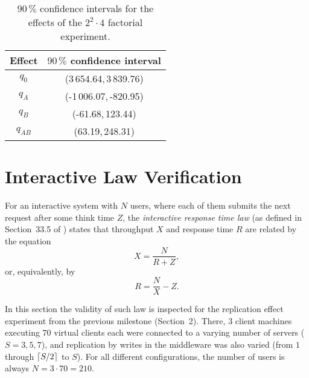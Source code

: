 \documentclass[11pt]{article}
\newcommand\task[1]{{\color[HTML]{999999}\subsection{Task}#1}}
\renewcommand\task[1]{}
\DeclarePairedDelimiter{\ceil}{\lceil}{\rceil}
\theoremstyle{definition}
\newcommand\re[1]{{\color[HTML]{ee1111}#1}}
\newcommand\bl[1]{{\color[HTML]{1111dd}#1}}
\begin{document}
\begin{table}[h!]
    \centering
    \small
    {
        \begin{tabular}{|c|c|}
            \hline
            \rowcolor{Gray}
            Effect & $90\,\%$ confidence interval \\
            \hline
            \cellcolor{Gray} $q_0$ & \bl{(3\,654.64,\,3\,839.76)} \\
            \cellcolor{Gray} $q_A$ & \bl{(-1\,006.07,\,-820.95)} \\
            \cellcolor{Gray} $q_B$ & \re{(-61.68,\,123.44)} \\
            \cellcolor{Gray} $q_{AB}$ & \bl{(63.19,\,248.31)} \\
            \hline
        \end{tabular}
    }
    \caption{$90\,\%$ confidence intervals for the effects of the $2^2\cdot4$ factorial experiment.}
    \label{tab:4_cis}
\end{table}

\task{
    Length: 1-3 pages
    
    Design a $2^k$ factorial experiment and follow the best practices outlined in the book and in the lecture to analyze the results. You are free to choose the parameters for the experiment and in case you have already collected data in the second milestone that can be used as source for this experiment, you can reuse it. Otherwise, in case you need to run new experiments anyway, we recommend exploring the impact of request size on the middleware together with an other parameter.}

\clearpage

\section{Interactive Law Verification}\label{sec:interactive-law}

For an interactive system with $N$ users, where each of them submits the next request after some think time $Z$, the \emph{interactive response time law} (as defined in Section~33.5 of \cite{jain91}) states that throughput $X$ and response time $R$ are related by the equation
\begin{equation}
    \label{eqn:5_tps_exp}
    X=\frac N{R+Z},
\end{equation}
or, equivalently, by
\[R=\frac NX-Z.\]

In this section the validity of such law is inspected for the replication effect experiment from the previous milestone (Section~2).
There, $3$ client machines executing $70$ virtual clients each were connected to a varying number of servers ($S=3,5,7$), and replication by writes in the middleware was also varied (from $1$ through $\ceil{S/2}$ to $S$).
For all different configurations, the number of users is always $N=3\cdot70=210$.
\end{document}
